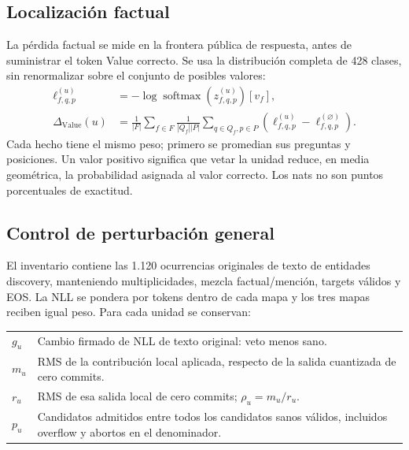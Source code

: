 \documentclass[11pt,a4paper]{article}
\newcommand{\factloss}{\Delta_{\mathrm{Value}}}
\begin{document}
\begin{center}
\end{center}

\subsection{Localización factual}
La pérdida factual se mide en la frontera pública de respuesta, antes de
suministrar el token Value correcto. Se usa la distribución completa de 428
clases, sin renormalizar sobre el conjunto de posibles valores:
\begin{align}
\ell_{f,q,p}^{(u)}&=-\log\operatorname{softmax}(z_{f,q,p}^{(u)})[v_f],\\
\factloss(u)&=\frac{1}{|F|}\sum_{f\in F}
  \frac{1}{|Q_f||P|}\sum_{q\in Q_f,p\in P}
  \left(\ell_{f,q,p}^{(u)}-\ell_{f,q,p}^{(\varnothing)}\right).
\end{align}
Cada hecho tiene el mismo peso; primero se promedian sus preguntas y posiciones.
Un valor positivo significa que vetar la unidad reduce, en media geométrica,
la probabilidad asignada al valor correcto. Los nats no son puntos porcentuales de exactitud.

\subsection{Control de perturbación general}
El inventario contiene las 1.120 ocurrencias originales de texto de entidades
discovery, manteniendo multiplicidades, mezcla factual/mención, targets válidos
y EOS. La NLL se pondera por tokens dentro de cada mapa y los tres mapas reciben
igual peso. Para cada unidad se conservan:
\begin{tabularx}{\linewidth}{@{}p{15mm}Y@{}}
\toprule
$g_u$ & Cambio firmado de NLL de texto original: veto menos sano.\\
$m_u$ & RMS de la contribución local aplicada, respecto de la salida cuantizada de cero commits.\\
$r_u$ & RMS de esa salida local de cero commits; $\rho_u=m_u/r_u$.\\
$p_u$ & Candidatos admitidos entre todos los candidatos sanos válidos, incluidos overflow y abortos en el denominador.\\
\bottomrule
\end{tabularx}
\end{document}
